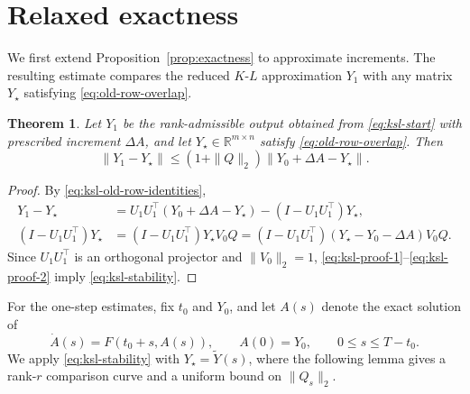 \documentclass[]{article}
\numberwithin{equation}{section}
\theoremstyle{plain}
\newtheorem{theorem}{Theorem}[section]
\theoremstyle{remark}
\numberwithin{algorithm}{section}
\newcommand{\R}{\mathbb{R}}
\begin{document}
\section{Relaxed exactness}
\label{sec:stable-exactness}

We first extend Proposition~\ref{prop:exactness} to approximate increments.
The resulting estimate compares the reduced \(K\)-\(L\) approximation \(Y_1\)
with any matrix \(Y_\star\) satisfying \eqref{eq:old-row-overlap}.

\begin{theorem}
\label{thm:stable-exactness}
Let \(Y_1\) be the rank-admissible output obtained from
\eqref{eq:ksl-start} with prescribed increment \(\Delta A\), and let
\(Y_\star\in\R^{m\times n}\) satisfy \eqref{eq:old-row-overlap}.  Then
\begin{equation}\label{eq:ksl-stability}
 \|Y_1-Y_\star\|\le(1+\|Q\|_2)\|Y_0+\Delta A-Y_\star\|.
\end{equation}
\end{theorem}

\begin{proof}
By \eqref{eq:ksl-old-row-identities},
\begin{align}
 Y_1-Y_\star
 &=U_1U_1^\top(Y_0+\Delta A-Y_\star)
   -(I-U_1U_1^\top)Y_\star,                             \label{eq:ksl-proof-1}\\
 (I-U_1U_1^\top)Y_\star
 &=(I-U_1U_1^\top)Y_\star V_0Q
  =(I-U_1U_1^\top)(Y_\star-Y_0-\Delta A)V_0Q.           \label{eq:ksl-proof-2}
\end{align}
Since \(U_1U_1^\top\) is an orthogonal projector and \(\|V_0\|_2=1\),
\eqref{eq:ksl-proof-1}--\eqref{eq:ksl-proof-2} imply
\eqref{eq:ksl-stability}.
\end{proof}

For the one-step estimates, fix \(t_0\) and \(Y_0\), and let \(A(s)\)
denote the exact solution of
\begin{equation}\label{eq:local-exact-solution}
 \dot A(s)=F(t_0+s,A(s)),\qquad A(0)=Y_0,
 \qquad 0\le s\le T-t_0.
\end{equation}
We apply \eqref{eq:ksl-stability} with
\(Y_\star=\widetilde Y(s)\), where the following lemma gives a
rank-\(r\) comparison curve and a uniform bound on \(\|Q_s\|_2\).
\end{document}
